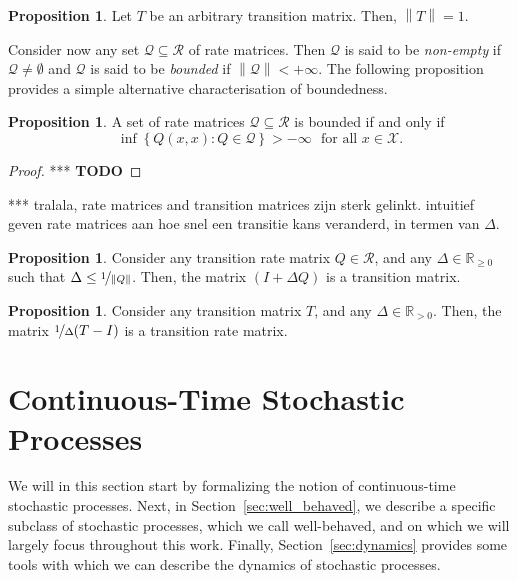 \documentclass[10pt]{paper}
\theoremstyle{definition}
\newtheorem{proposition}[theorem]{Proposition}
\newcommand{\reals}{\mathbb{R}}
\newcommand{\realspos}{\reals_{>0}}
\newcommand{\realsnonneg}{\reals_{\geq 0}}
\newcommand{\states}{\mathcal{X}}
\newcommand{\rateset}{\mathcal{Q}}
\newcommand{\norm}[1]{\left\lVert #1 \right\rVert}
\begin{document}
\begin{proposition}
Let $T$ be an arbitrary transition matrix. Then, $\norm{T}=1$.
\end{proposition}

Consider now any set $\rateset\subseteq\mathcal{R}$ of rate matrices. Then $\rateset$ is said to be \emph{non-empty} if $\rateset\neq\emptyset$ and $\rateset$ is said to be \emph{bounded} if $\norm{\rateset}<+\infty$. The following proposition provides a simple alternative characterisation of boundedness.

\begin{proposition}\label{prop:alternativedefforbounded}
A set of rate matrices $\rateset\subseteq\mathcal{R}$ is bounded if and only if
\begin{equation*}
\inf\left\{Q(x,x)\colon Q\in\rateset\right\}>-\infty\text{~~for all $x\in\states$.}
\end{equation*}
\end{proposition}
\begin{proof}
*** {\bf TODO}
\end{proof}

*** tralala, rate matrices and transition matrices zijn sterk gelinkt.  intuitief geven rate matrices aan hoe snel een transitie kans veranderd, in termen van $\Delta$.

\begin{proposition}\label{prop:stochastic_from_rate_matrix}
Consider any transition rate matrix $Q\in\mathcal{R}$, and any $\Delta\in\realsnonneg$ such that $\Delta \leq \nicefrac{1}{\norm{Q}}$. Then, the matrix $(I+\Delta Q)$ is a transition matrix.
\end{proposition}

\begin{proposition}\label{prop:rate_from_stochastic_matrix}
Consider any transition matrix $T$, and any $\Delta\in\realspos$. Then, the matrix $\nicefrac{1}{\Delta}(T-I)$ is a transition rate matrix.
\end{proposition}

\section{Continuous-Time Stochastic Processes}\label{sec:stochastic_processes}

We will in this section start by formalizing the notion of continuous-time stochastic processes. Next, in Section~\ref{sec:well_behaved}, we describe a specific subclass of stochastic processes, which we call well-behaved, and on which we will largely focus throughout this work. Finally, Section~\ref{sec:dynamics} provides some tools with which we can describe the dynamics of stochastic processes.
\end{document}
